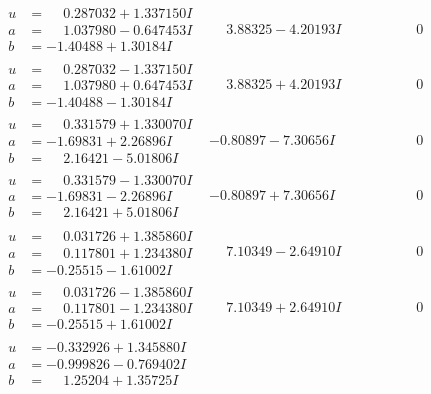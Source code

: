 \documentclass[1p]{elsarticle_modified}
\theoremstyle{definition}
\begin{document}
$$\begin{array}{c|c|c}
\begin{aligned}
u &= \phantom{-}0.287032 + 1.337150 I \\
a &= \phantom{-}1.037980 - 0.647453 I \\
b &= -1.40488 + 1.30184 I\end{aligned}
 & \phantom{-}3.88325 - 4.20193 I & \phantom{-0.000000 } 0 \\ \hline\begin{aligned}
u &= \phantom{-}0.287032 - 1.337150 I \\
a &= \phantom{-}1.037980 + 0.647453 I \\
b &= -1.40488 - 1.30184 I\end{aligned}
 & \phantom{-}3.88325 + 4.20193 I & \phantom{-0.000000 } 0 \\ \hline\begin{aligned}
u &= \phantom{-}0.331579 + 1.330070 I \\
a &= -1.69831 + 2.26896 I \\
b &= \phantom{-}2.16421 - 5.01806 I\end{aligned}
 & -0.80897 - 7.30656 I & \phantom{-0.000000 } 0 \\ \hline\begin{aligned}
u &= \phantom{-}0.331579 - 1.330070 I \\
a &= -1.69831 - 2.26896 I \\
b &= \phantom{-}2.16421 + 5.01806 I\end{aligned}
 & -0.80897 + 7.30656 I & \phantom{-0.000000 } 0 \\ \hline\begin{aligned}
u &= \phantom{-}0.031726 + 1.385860 I \\
a &= \phantom{-}0.117801 + 1.234380 I \\
b &= -0.25515 - 1.61002 I\end{aligned}
 & \phantom{-}7.10349 - 2.64910 I & \phantom{-0.000000 } 0 \\ \hline\begin{aligned}
u &= \phantom{-}0.031726 - 1.385860 I \\
a &= \phantom{-}0.117801 - 1.234380 I \\
b &= -0.25515 + 1.61002 I\end{aligned}
 & \phantom{-}7.10349 + 2.64910 I & \phantom{-0.000000 } 0 \\ \hline\begin{aligned}
u &= -0.332926 + 1.345880 I \\
a &= -0.999826 - 0.769402 I \\
b &= \phantom{-}1.25204 + 1.35725 I\end{aligned}

\end{array}$$
\end{document}
